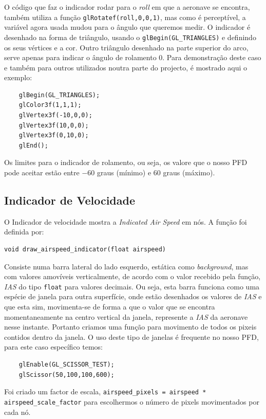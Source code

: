 \documentclass[palatino]{ist-report}
\begin{document}
O código que faz o indicador rodar para o \textit{roll} em que a aeronave se encontra, também utiliza a função \texttt{glRotatef(roll,0,0,1)}, mas como é perceptível, a variável agora usada mudou para o ângulo que queremos medir. O indicador é desenhado na forma de triângulo, usando o \texttt{glBegin(GL\_TRIANGLES)} e definindo os seus vértices e a cor. Outro triângulo desenhado na parte superior do arco, serve apenas para indicar o ângulo de rolamento 0. Para demonstração deste caso e também para outros utilizados noutra parte do projecto, é mostrado aqui o exemplo:
\begin{verbatim}
    glBegin(GL_TRIANGLES);
    glColor3f(1,1,1);
    glVertex3f(-10,0,0);
    glVertex3f(10,0,0);
    glVertex3f(0,10,0);
    glEnd();
\end{verbatim}

Os limites para o indicador de rolamento, ou seja, os valore que o nosso PFD pode aceitar estão entre $-60$ graus (mínimo) e $60$ graus (máximo).  


\subsection{Indicador de Velocidade}
O Indicador de velocidade mostra a \textit{Indicated Air Speed} em nós.
A função foi definida por:
\begin{verbatim}
void draw_airspeed_indicator(float airspeed)
\end{verbatim}
Consiste numa barra lateral do lado esquerdo, estática como \textit{background}, mas com valores amovíveis verticalmente, de acordo com o valor recebido pela função, \textit{IAS} do tipo \texttt{float} para valores decimais. Ou seja, esta barra funciona como uma espécie de janela para outra superfície, onde estão desenhados os valores de \textit{IAS} e que esta sim, movimenta-se de forma a que o valor que se encontra momentaneamente na centro vertical da janela, represente a \textit{IAS} da aeronave nesse instante. Portanto criamos uma função para movimento de todos os pixeis contidos dentro da janela. O uso deste tipo de janelas é frequente no nosso PFD, para este caso específico temos:

\begin{verbatim}
    glEnable(GL_SCISSOR_TEST);
    glScissor(50,100,100,600);    
\end{verbatim}

Foi criado um factor de escala, \texttt{airspeed_pixels = airspeed * airspeed_scale_factor} para escolhermos o número de pixels movimentados por cada nó.  
\end{document}
